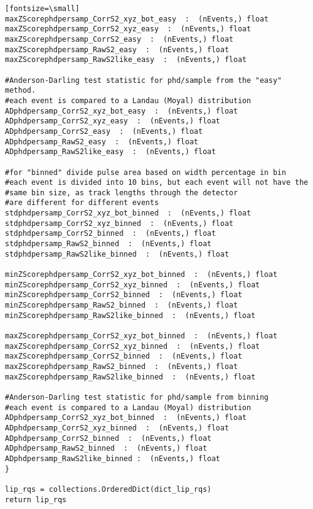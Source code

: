 \begin{verbatim}[fontsize=\small]
maxZScorephdpersamp_CorrS2_xyz_bot_easy  :  (nEvents,) float
maxZScorephdpersamp_CorrS2_xyz_easy  :  (nEvents,) float
maxZScorephdpersamp_CorrS2_easy  :  (nEvents,) float
maxZScorephdpersamp_RawS2_easy  :  (nEvents,) float
maxZScorephdpersamp_RawS2like_easy  :  (nEvents,) float

#Anderson-Darling test statistic for phd/sample from the "easy" method.
#each event is compared to a Landau (Moyal) distribution
ADphdpersamp_CorrS2_xyz_bot_easy  :  (nEvents,) float
ADphdpersamp_CorrS2_xyz_easy  :  (nEvents,) float
ADphdpersamp_CorrS2_easy  :  (nEvents,) float
ADphdpersamp_RawS2_easy  :  (nEvents,) float
ADphdpersamp_RawS2like_easy  :  (nEvents,) float

#for "binned" divide pulse area based on width percentage in bin
#each event is divided into 10 bins, but each event will not have the 
#same bin size, as track lengths through the detector 
#are different for different events
stdphdpersamp_CorrS2_xyz_bot_binned  :  (nEvents,) float
stdphdpersamp_CorrS2_xyz_binned  :  (nEvents,) float
stdphdpersamp_CorrS2_binned  :  (nEvents,) float
stdphdpersamp_RawS2_binned  :  (nEvents,) float
stdphdpersamp_RawS2like_binned  :  (nEvents,) float

minZScorephdpersamp_CorrS2_xyz_bot_binned  :  (nEvents,) float
minZScorephdpersamp_CorrS2_xyz_binned  :  (nEvents,) float
minZScorephdpersamp_CorrS2_binned  :  (nEvents,) float
minZScorephdpersamp_RawS2_binned  :  (nEvents,) float
minZScorephdpersamp_RawS2like_binned  :  (nEvents,) float

maxZScorephdpersamp_CorrS2_xyz_bot_binned  :  (nEvents,) float
maxZScorephdpersamp_CorrS2_xyz_binned  :  (nEvents,) float
maxZScorephdpersamp_CorrS2_binned  :  (nEvents,) float
maxZScorephdpersamp_RawS2_binned  :  (nEvents,) float
maxZScorephdpersamp_RawS2like_binned  :  (nEvents,) float

#Anderson-Darling test statistic for phd/sample from binning
#each event is compared to a Landau (Moyal) distribution
ADphdpersamp_CorrS2_xyz_bot_binned  :  (nEvents,) float
ADphdpersamp_CorrS2_xyz_binned  :  (nEvents,) float
ADphdpersamp_CorrS2_binned  :  (nEvents,) float
ADphdpersamp_RawS2_binned  :  (nEvents,) float
ADphdpersamp_RawS2like_binned :  (nEvents,) float
}

lip_rqs = collections.OrderedDict(dict_lip_rqs)
return lip_rqs
\end{verbatim}
